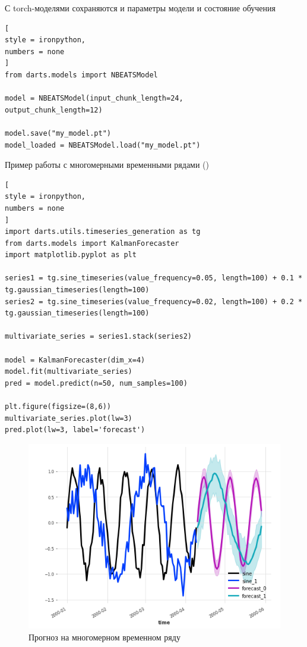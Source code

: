 \documentclass[%
	11pt,
	a4paper,
	utf8,
		]{article}
\begin{document}
С torch-моделями сохраняются и параметры модели и состояние обучения
\begin{lstlisting}[
style = ironpython,
numbers = none
]
from darts.models import NBEATSModel

model = NBEATSModel(input_chunk_length=24,
output_chunk_length=12)

model.save("my_model.pt")
model_loaded = NBEATSModel.load("my_model.pt")
\end{lstlisting}

Пример работы с многомерными временными рядами ()
\begin{lstlisting}[
style = ironpython,
numbers = none
]
import darts.utils.timeseries_generation as tg
from darts.models import KalmanForecaster
import matplotlib.pyplot as plt

series1 = tg.sine_timeseries(value_frequency=0.05, length=100) + 0.1 * tg.gaussian_timeseries(length=100)
series2 = tg.sine_timeseries(value_frequency=0.02, length=100) + 0.2 * tg.gaussian_timeseries(length=100)

multivariate_series = series1.stack(series2)

model = KalmanForecaster(dim_x=4)
model.fit(multivariate_series)
pred = model.predict(n=50, num_samples=100)

plt.figure(figsize=(8,6))
multivariate_series.plot(lw=3)
pred.plot(lw=3, label='forecast')
\end{lstlisting}

\begin{figure}[h]
	\centering
	\includegraphics[scale=1.2 ]{figures/multivar_series.png}
	\caption{ Прогноз на многомерном временном ряду }\label{fig:multivar_series}
\end{figure}
\end{document}
